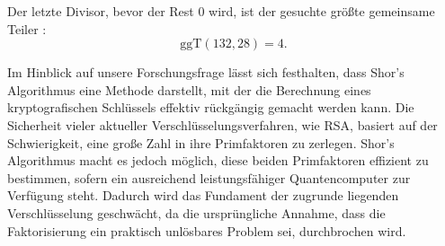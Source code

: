 Der letzte Divisor, bevor der Rest $0$ wird, ist der gesuchte größte gemeinsame Teiler \cite{euklid}:
\[
\text{ggT}(132, 28) = 4. 
\] 

Im Hinblick auf unsere Forschungsfrage lässt sich festhalten, dass Shor's Algorithmus eine 
Methode darstellt, mit der die Berechnung eines kryptografischen Schlüssels effektiv rückgängig 
gemacht werden kann. Die Sicherheit vieler aktueller Verschlüsselungsverfahren, wie RSA, basiert 
auf der Schwierigkeit, eine große Zahl in ihre Primfaktoren zu zerlegen. Shor's Algorithmus macht 
es jedoch möglich, diese beiden Primfaktoren effizient zu bestimmen, sofern ein ausreichend 
leistungsfähiger Quantencomputer zur Verfügung steht. Dadurch wird das Fundament der zugrunde 
liegenden Verschlüsselung geschwächt, da die ursprüngliche Annahme, dass die Faktorisierung ein 
praktisch unlösbares Problem sei, durchbrochen wird.


